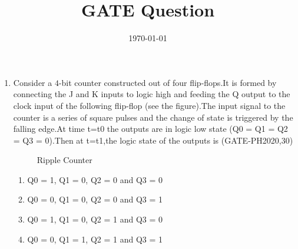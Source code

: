 \documentclass[12pt,-letter paper]{article}
\title{GATE Question}
\date{\today}
\theoremstyle{remark}
\begin{document}
\maketitle
\begin{enumerate}
  
	\item Consider a $4$-bit counter constructed out of four flip-flops.It is formed by connecting the J and K inputs to logic high and feeding the Q output to the clock input of the following flip-flop (see the figure).The input signal to the counter is a series of square pulses and the change of state is triggered by the falling edge.At time t=t0 the outputs are in logic low state (Q0 = Q1 = Q2 = Q3 = 0).Then at t=t1,the logic state of the outputs is 
		\hfill(GATE-PH2020,30)
                \begin{figure}
                \centering
                
                \caption{Ripple Counter}
                \label{fig:4 Bit Ripple Counter}
                \end{figure}
		  \begin{enumerate}
          \item  Q0 = 1, Q1 = 0, Q2 = 0 and Q3 = 0 
          \item  Q0 = 0, Q1 = 0, Q2 = 0 and Q3 = 1
	  \item  Q0 = 1, Q1 = 0, Q2 = 1 and Q3 = 0
          \item  Q0 = 0, Q1 = 1, Q2 = 1 and Q3 = 1		  

      \end{enumerate}
  \end{enumerate}
  
\end{document}
